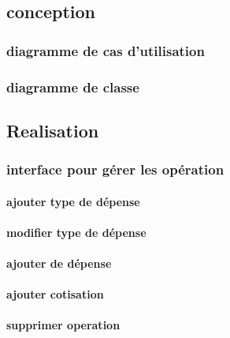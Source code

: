 \subsection{conception}
\subsubsection{diagramme de cas d'utilisation}

\subsubsection{diagramme de classe}

\subsection{Realisation}
\subsubsection{interface pour gérer les opération}
\paragraph{ajouter type de dépense}
\paragraph{modifier type de dépense}
\paragraph{ajouter de dépense}
\paragraph{ajouter cotisation}
\paragraph{supprimer operation}



